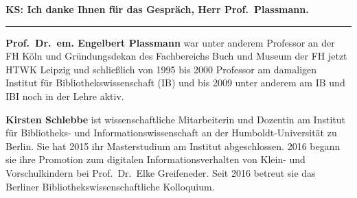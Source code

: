 \documentclass[a4paper,
fontsize=11pt,
oneside,
numbers=noperiodatend,
parskip=half-,
bibliography=totoc,
final
]{scrartcl}
\begin{document}
\textbf{KS: Ich danke Ihnen für das Gespräch, Herr Prof.~Plassmann.}

\begin{center}\rule{0.5\linewidth}{\linethickness}\end{center}

\textbf{Prof.~Dr.~em. Engelbert Plassmann} war unter anderem Professor
an der FH Köln und Gründungsdekan des Fachbereichs Buch und Museum der
FH jetzt HTWK Leipzig und schließlich von 1995 bis 2000 Professor am
damaligen Institut für Bibliothekswissenschaft (IB) und bis 2009 unter
anderem am IB und IBI noch in der Lehre aktiv.

\textbf{Kirsten Schlebbe} ist wissenschaftliche Mitarbeiterin und
Dozentin am Institut für Bibliotheks- und Informationswissenschaft an
der Humboldt-Universität zu Berlin. Sie hat 2015 ihr Masterstudium am
Institut abgeschlossen. 2016 begann sie ihre Promotion zum digitalen
Informationsverhalten von Klein- und Vorschulkindern bei Prof.~Dr.~Elke
Greifeneder. Seit 2016 betreut sie das Berliner
Bibliothekswissenschaftliche Kolloquium.
\end{document}
